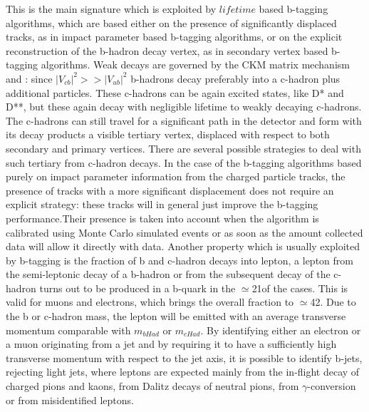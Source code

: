 This is the main signature which is exploited by $lifetime$ based b-tagging algorithms, which are based either on the presence of significantly displaced tracks, as in impact parameter based b-tagging algorithms, or on the explicit reconstruction of the b-hadron decay vertex, as in secondary vertex based b-tagging algorithms.
Weak decays are governed by the CKM matrix mechanism \cite{Giac_72} and \cite{Giac_73}: since $|V_{cb}|^2 >> |V_{ub}|^2$ b-hadrons decay preferably into a c-hadron plus additional particles. These c-hadrons can be again excited states, like D* and D**, but these again decay with negligible lifetime to weakly decaying c-hadrons.
The c-hadrons can still travel for a significant path in the detector and form with its decay products a visible tertiary vertex, displaced with respect to both secondary and primary vertices.
There are several possible strategies to deal with such tertiary from c-hadron decays. In the case of the b-tagging algorithms based purely on impact parameter information from the charged particle tracks, the presence of tracks with a more significant displacement does not require an explicit strategy: these tracks will in general just improve the b-tagging performance.Their presence is taken into account when the algorithm is calibrated using Monte Carlo simulated events or as soon as the amount collected data will allow it directly with data.
Another property which is usually exploited by b-tagging is the fraction of b and c-hadron decays into lepton, a lepton from the semi-leptonic decay of a b-hadron or from the subsequent decay of the c-hadron turns out to be produced in a b-quark in the $\simeq$21\percent of the cases. This is valid for muons and electrons, which brings the overall fraction to $\simeq$42\percent. Due to the b or c-hadron mass, the lepton will be emitted with an average transverse momentum comparable with $m_{bHad}$ or $m_{cHad}$. By identifying either an electron or a muon originating from a jet and by requiring it to have a sufficiently high transverse momentum with respect to the jet axis, it is possible to identify b-jets, rejecting light jets, where leptons are expected mainly from the in-flight decay of charged pions and kaons, from Dalitz decays of neutral pions, from $\gamma$-conversion or from misidentified leptons.
